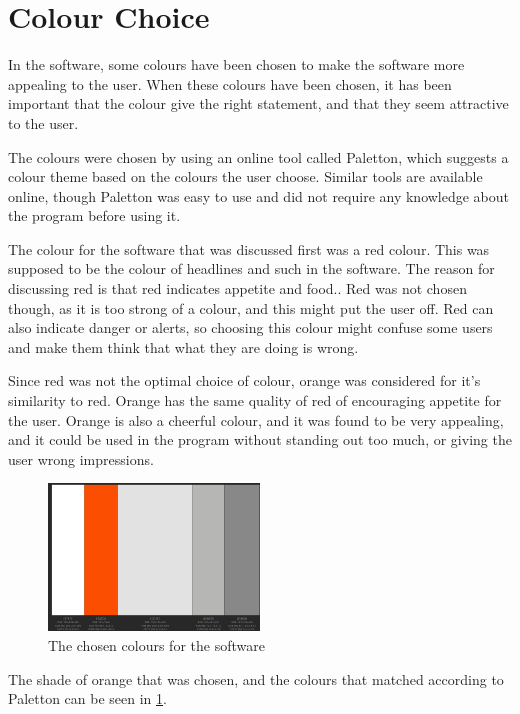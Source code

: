 \section{Colour Choice}

In the software, some colours have been chosen to make the software more appealing to the user. When these colours have been chosen, it has been important that the colour give the right statement, and that they seem attractive to the user.

The colours were chosen by using an online tool called Paletton, which suggests a colour theme based on the colours the user choose. Similar tools are available online, though Paletton was easy to use and did not require any knowledge about the program before using it.

The colour for the software that was discussed first was a red colour. This was supposed to be the colour of headlines and such in the software. The reason for discussing red is that red indicates appetite and food.. Red was not chosen though, as it is too strong of a colour, and this might put the user off. Red can also indicate danger or alerts, so choosing this colour might confuse some users and make them think that what they are doing is wrong.

Since red was not the optimal choice of colour, orange was considered for it's similarity to red. Orange has the same quality of red of encouraging appetite for the user. Orange is also a cheerful colour, and it was found to be very appealing, and it could be used in the program without standing out too much, or giving the user wrong impressions.

\begin{figure}[H]
	\centering
    \includegraphics[width=0.5\textwidth]{Grafik/FoodPlanner/ChosenColours}
	\caption{The chosen colours for the software}
	\label{ChosenColours}
\end{figure}

The shade of orange that was chosen, and the colours that matched according to Paletton can be seen in \cref{ChosenColours}.

